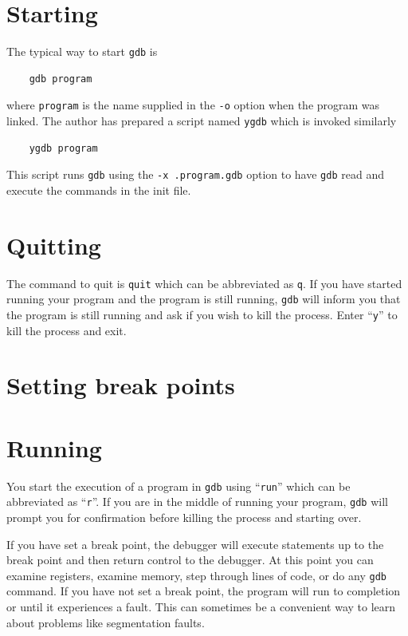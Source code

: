 \documentclass[11pt,b5paper]{book}
\begin{document}
\section{Starting}

The typical way to start {\tt gdb} is
\begin{verbatim}
    gdb program
\end{verbatim}
where {\tt program} is the name supplied in the {\tt -o} option when the program was linked.
The author has prepared a script named {\tt ygdb} which is invoked similarly              
\begin{verbatim}
    ygdb program
\end{verbatim}
This script runs {\tt gdb} using the {\tt -x .program.gdb} option to have {\tt gdb} read and execute the
commands in the init file.

\section{Quitting}

The command to quit is {\tt quit} which can be abbreviated as {\tt q}. 
If you have started running your program and the program is still running, {\tt gdb} will inform you that
the program is still running and ask if you wish to kill the process.
Enter ``{\tt y}'' to kill the process and exit.

\section{Setting break points}

\section{Running}

You start the execution of a program in {\tt gdb} using ``{\tt run}'' which can be abbreviated as ``{\tt r}''. 
If you are in the middle of running your program, {\tt gdb} will prompt you for confirmation before killing
the process and starting over.

If you have set a break point, the debugger will execute statements up to the break point and then return
control to the debugger.
At this point you can examine registers, examine memory, step through lines of code, or do any {\tt gdb}
command.
If you have not set a break point, the program will run to completion or until it experiences a fault.
This can sometimes be a convenient way to learn about problems like segmentation faults.
\end{document}
